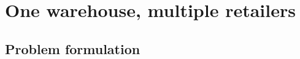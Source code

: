%
%
\section{One warehouse, multiple retailers}
\label{sec:owmr}

\subsection{Problem formulation}
\label{sec:owmr-formulation}

